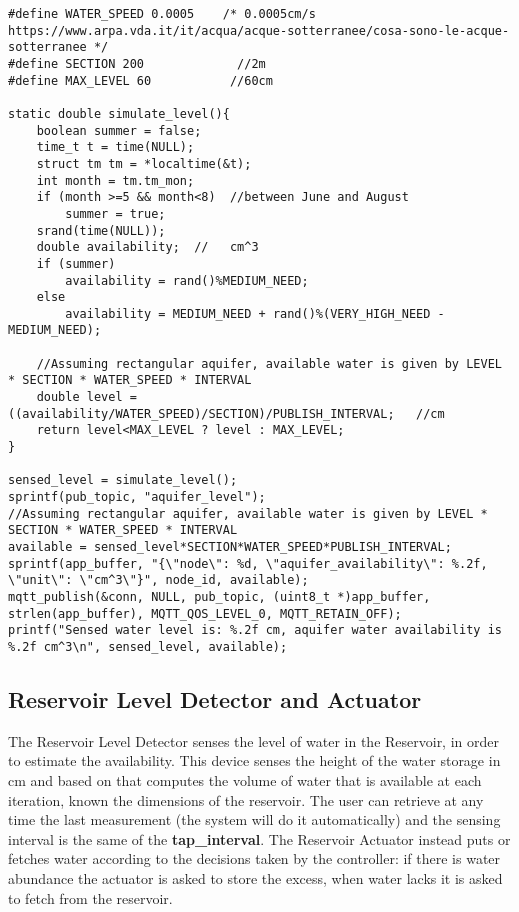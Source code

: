 \begin{lstlisting}
#define WATER_SPEED 0.0005    /* 0.0005cm/s   https://www.arpa.vda.it/it/acqua/acque-sotterranee/cosa-sono-le-acque-sotterranee */
#define SECTION 200             //2m
#define MAX_LEVEL 60           //60cm

static double simulate_level(){
    boolean summer = false;
    time_t t = time(NULL);
    struct tm tm = *localtime(&t);
    int month = tm.tm_mon;
    if (month >=5 && month<8)  //between June and August
        summer = true;
    srand(time(NULL));
    double availability;  //   cm^3
    if (summer)
        availability = rand()%MEDIUM_NEED;
    else
        availability = MEDIUM_NEED + rand()%(VERY_HIGH_NEED - MEDIUM_NEED);

    //Assuming rectangular aquifer, available water is given by LEVEL * SECTION * WATER_SPEED * INTERVAL
    double level = ((availability/WATER_SPEED)/SECTION)/PUBLISH_INTERVAL;   //cm
    return level<MAX_LEVEL ? level : MAX_LEVEL;
}    
    
sensed_level = simulate_level();
sprintf(pub_topic, "aquifer_level");
//Assuming rectangular aquifer, available water is given by LEVEL * SECTION * WATER_SPEED * INTERVAL
available = sensed_level*SECTION*WATER_SPEED*PUBLISH_INTERVAL;
sprintf(app_buffer, "{\"node\": %d, \"aquifer_availability\": %.2f, \"unit\": \"cm^3\"}", node_id, available);
mqtt_publish(&conn, NULL, pub_topic, (uint8_t *)app_buffer, strlen(app_buffer), MQTT_QOS_LEVEL_0, MQTT_RETAIN_OFF);
printf("Sensed water level is: %.2f cm, aquifer water availability is %.2f cm^3\n", sensed_level, available);
\end{lstlisting}



\subsection{Reservoir Level Detector and Actuator}
The Reservoir Level Detector senses the level of water in the Reservoir, in order to estimate the availability. This device senses the height of the water storage in cm and based on that computes the volume of water that is available at each iteration, known the dimensions of the reservoir. The user can retrieve at any time the last measurement (the system will do it automatically) and the sensing interval is the same of the \textbf{tap\_interval}. The Reservoir Actuator instead puts or fetches water according to the decisions taken by the controller: if there is water abundance the actuator is asked to store the excess, when water lacks it is asked to fetch from the reservoir.


